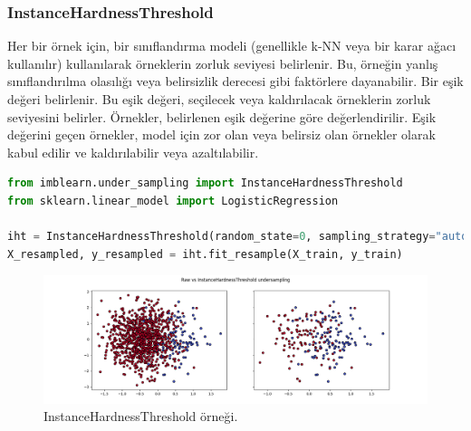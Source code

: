 \newpage

\subsubsection{InstanceHardnessThreshold}
Her bir örnek için, bir sınıflandırma modeli (genellikle k-NN veya bir karar ağacı kullanılır) kullanılarak örneklerin zorluk seviyesi belirlenir. Bu, örneğin yanlış sınıflandırılma olasılığı veya belirsizlik derecesi gibi faktörlere dayanabilir. Bir eşik değeri belirlenir. Bu eşik değeri, seçilecek veya kaldırılacak örneklerin zorluk seviyesini belirler. Örnekler, belirlenen eşik değerine göre değerlendirilir. Eşik değerini geçen örnekler, model için zor olan veya belirsiz olan örnekler olarak kabul edilir ve kaldırılabilir veya azaltılabilir.

\begin{lstlisting}[language=Python]
from imblearn.under_sampling import InstanceHardnessThreshold
from sklearn.linear_model import LogisticRegression

iht = InstanceHardnessThreshold(random_state=0, sampling_strategy="auto", estimator=LogisticRegression())
X_resampled, y_resampled = iht.fit_resample(X_train, y_train)
\end{lstlisting}

\begin{figure}[h]
    \centering
    \includegraphics[width=1\textwidth]{images/Raw vs InstanceHardnessThreshold undersampling.png}
    \caption{InstanceHardnessThreshold örneği.}
    \label{fig:enter-label}
\end{figure}

\newpage